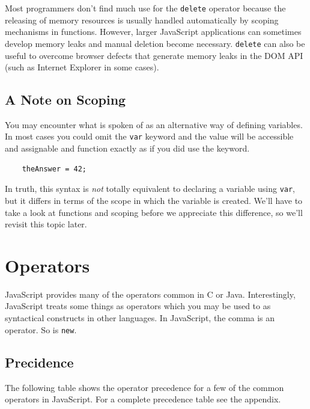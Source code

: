 \documentclass[11pt,letter]{book}
\begin{document}
    Most programmers don't find much use for the \texttt{delete} operator because the releasing of 
    memory resources is usually handled automatically by scoping mechanisms in functions. However, 
    larger JavaScript applications can sometimes develop memory leaks and manual deletion become 
    necessary. \texttt{delete} can also be useful to overcome browser defects that generate memory 
    leaks in the DOM API (such as Internet Explorer in some cases).
    
    \subsection{A Note on Scoping}
    You may encounter what is spoken of as an alternative way of defining variables. In most cases
    you could omit the \texttt{var} keyword and the value will be accessible and assignable and 
    function exactly as if you did use the keyword.
    
    \begin{verbatim}
    theAnswer = 42;
    \end{verbatim}
    
    In truth, this syntax is \emph{not} totally equivalent to declaring a variable using 
    \texttt{var}, but it differs in terms of the scope in which the variable is created. We'll have 
    to take a look at functions and scoping before we appreciate this difference, so we'll revisit 
    this topic later.
    
    \section{Operators}
    JavaScript provides many of the operators common in C or Java. Interestingly, JavaScript treats
    some things as operators which you may be used to as syntactical constructs in other languages.
    In JavaScript, the comma is an operator. So is \texttt{new}.
    
    \subsection{Precidence}
    The following table shows the operator precedence for a few of the common operators in 
    JavaScript. For a complete precedence table see the appendix.
    
\end{document}
